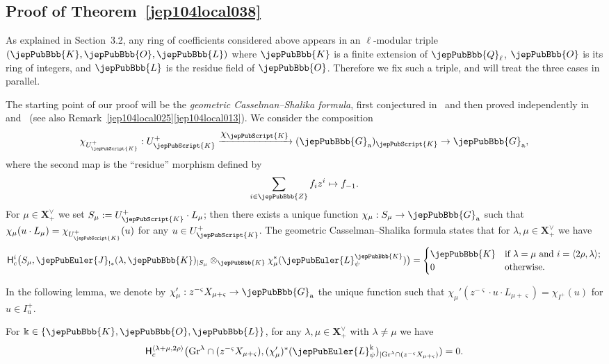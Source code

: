 \subsection{Proof of Theorem~\ref{jep104local038}}

As explained in Section~3.2, any ring of coefficients considered above appears in an $\ell$-modular triple $(\jepPubBbb{K},\jepPubBbb{O},\jepPubBbb{L})$ where $\jepPubBbb{K}$ is a finite extension of $\jepPubBbb{Q}_\ell$, $\jepPubBbb{O}$ is its ring of integers, and $\jepPubBbb{L}$ is the residue field of $\jepPubBbb{O}$. Therefore we fix such a triple, and will treat the three cases in parallel.

The starting point of our proof will be the \emph{geometric Casselman--Shalika formula}, first conjectured in~\cite{jep104ref25} and then proved independently in~\cite{jep104ref26} and~\cite{jep104ref38} (see also Remark~\ref{jep104local025}\eqref{jep104local013}). We consider the composition
\[
 \chi_{U^+_{\jepPubScript{K}}} : U^+_{\jepPubScript{K}} \xrightarrow{\textstyle\chi_{\jepPubScript{K}}} (\jepPubBbb{G}_{\mathrm{a}})_{\jepPubScript{K}} \to \jepPubBbb{G}_{\mathrm{a}},
\]
where the second map is the ``residue'' morphism defined by
\[
 \sum_{i \in \jepPubBbb{Z}} f_i z^i \mapsto f_{-1}.
\]
For $\mu \in \boldsymbol{X}^\vee_+$ we set $S_\mu := U^+_{\jepPubScript{K}} \cdot L_\mu$; then there exists a unique function $\chi_\mu : S_\mu \to \jepPubBbb{G}_{\mathrm{a}}$ such that $\chi_\mu(u \cdot L_\mu)=\chi_{U^+_{\jepPubScript{K}}}(u)$ for any $u \in U^+_{\jepPubScript{K}}$. The geometric Casselman--Shalika formula states that for $\lambda,\mu \in \boldsymbol{X}^\vee_+$ we have
\begin{equation}
\label{jep104local002}
\mathsf{H}^i_c \bigl( S_\mu, \jepPubEuler{J}_{!*}(\lambda,\jepPubBbb{K})_{|S_\mu} \otimes_{\jepPubBbb{K}} \chi_\mu^*(\jepPubEuler{L}_\psi^{\jepPubBbb{K}}) \bigr) = \begin{cases}
\jepPubBbb{K} & \text{if $\lambda=\mu$ and $i=\langle 2\rho,\lambda\rangle$;} \\
0 & \text{otherwise.}
\end{cases}
\end{equation}

In the following lemma, we denote by $\chi_\mu' : z^{-\varsigma} X_{\mu+\varsigma} \to \jepPubBbb{G}_{\mathrm{a}}$ the unique function such that $\chi_\mu'(z^{-\varsigma} \cdot u \cdot L_{\mu+\varsigma}) = \chi_{I^+}(u)$ for $u \in I_\mathrm{u}^+$.

\begin{lem}
\label{jep104local022}
For $\Bbbk \in \{\jepPubBbb{K},\jepPubBbb{O},\jepPubBbb{L}\}$, for any $\lambda,\mu \in \boldsymbol{X}^\vee_+$ with $\lambda \neq \mu$ we have
\[
\mathsf{H}^{\langle \lambda+\mu,2\rho \rangle}_c \bigl( \mathrm{Gr}^\lambda \cap (z^{-\varsigma} X_{\mu+\varsigma}), (\chi_\mu')^*(\jepPubEuler{L}^\Bbbk_\psi)_{|\mathrm{Gr}^\lambda \cap (z^{-\varsigma} X_{\mu+\varsigma})}) = 0.
\]
\end{lem}

